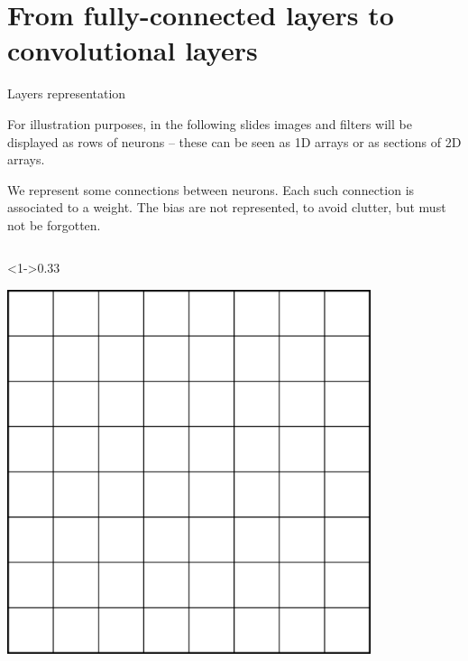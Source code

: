 \documentclass[xcolor=pdftex,dvipsnames,table,mathserif]{beamer}
\begin{document}
\section{From fully-connected layers to convolutional layers}

\begin{frame}{Layers representation}

    \begin{block}{}
      For illustration purposes, in the following slides images and filters will be displayed as rows of neurons -- these can be seen as 1D arrays or as sections of 2D arrays.

      We represent some connections between neurons. Each such connection is associated to a weight. The bias are not represented, to avoid clutter, but must not be forgotten.
  \end{block}

  \begin{columns}

    \begin{column}<1->{0.33\textwidth}
      \begin{center}
        \includegraphics[width=0.80\textwidth]{cnn_pixels.png}
      \end{center}
    \end{column}


\end{columns}
\end{frame}
\end{document}
